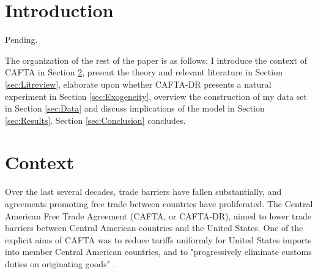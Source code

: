 \documentclass[12pt]{article}
\title{
\textmd{\textbf{\Title}}
\textbf{\author{\AuthorName \\ \Class \date{\today}}}}
\begin{document}
\newcommand{\Title}{Trade Liberalization and the Dominican Republic}
\newcommand{\Class}{Economics 4993}
\newcommand{\AuthorName}{James Sayre}
      
\maketitle
\doublespacing
\setcounter{footnote}{0}
\renewcommand{\thefootnote}{\arabic{footnote}}

\vspace{-25pt}
\begin{abstract}
I examine the impact of modern day trade liberalization on the wages of workers in the Dominican
Republic. The Central American Free Trade Agreement reduced nominal Dominican input tariffs
from an average of 12.06\% to 2.73\% from member countries, particularly the United States, over the
short period of 2006-2007. More pending. 
\end{abstract}

\vspace{-10pt}
\section{Introduction}
\label{sec:Introduction}

Pending.

The organization of the rest of the paper is as follows; 
I introduce the context of CAFTA in Section \ref{sec:Context},
present the theory and relevant literature in Section \ref{sec:Litreview},
elaborate upon whether CAFTA-DR presents a natural experiment in Section \ref{sec:Exogeneity},
overview the construction of my data set in Section \ref{sec:Data}
and discuss implications of the model
in Section \ref{sec:Results}. Section \ref{sec:Conclusion} concludes.

\vspace{-10pt}
\section{Context}
\label{sec:Context}
Over the last several decades, trade barriers have fallen substantially, and agreements promoting
free trade between countries have proliferated. The Central American Free Trade 
Agreement (CAFTA, or CAFTA-DR), aimed to lower trade barriers between Central American countries and 
the United States. One of the explicit aims of CAFTA was to reduce tariffs uniformly 
for United States imports into member Central American countries, and to "progressively eliminate customs duties on 
originating goods" \citep{ustraderep}.
\end{document}
